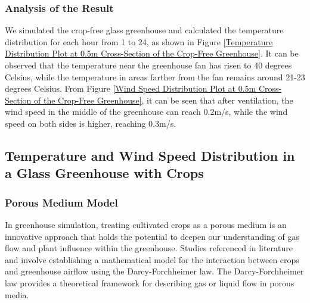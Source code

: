 \documentclass{apmcmthesis}
\begin{document}
{\subsubsection{Analysis of the Result}

We simulated the crop-free glass greenhouse and calculated the temperature distribution for each hour from 1 to 24, as shown in Figure \ref{Temperature Distribution Plot at 0.5m Cross-Section of the Crop-Free Greenhouse}. It can be observed that the temperature near the greenhouse fan has risen to 40 degrees Celsius, while the temperature in areas farther from the fan remains around 21-23 degrees Celsius. From Figure \ref{Wind Speed Distribution Plot at 0.5m Cross-Section of the Crop-Free Greenhouse}, it can be seen that after ventilation, the wind speed in the middle of the greenhouse can reach 0.2m/s, while the wind speed on both sides is higher, reaching 0.3m/s.

\subsection{Temperature and Wind Speed Distribution in a Glass Greenhouse with Crops}

\subsubsection{Porous Medium Model}

In greenhouse simulation, treating cultivated crops as a porous medium is an innovative approach that holds the potential to deepen our understanding of gas flow and plant influence within the greenhouse. Studies referenced in literature \cite{4} and \cite{6} involve establishing a mathematical model for the interaction between crops and greenhouse airflow using the Darcy-Forchheimer law. The Darcy-Forchheimer law provides a theoretical framework for describing gas or liquid flow in porous media.

}
\end{document}
